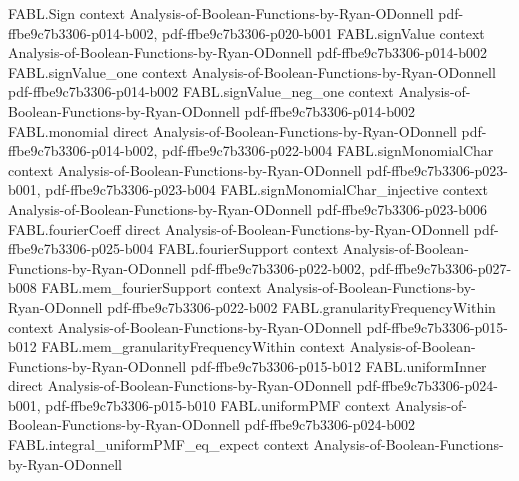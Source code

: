\begin{theorem}
\label{FABL.signValue_eq_biasMean_add_sigma_mul_biasedMonomial_singleton}
\leanok
{}
\proofstep
  {FABL.Sign}
  {context}
  {Analysis-of-Boolean-Functions-by-Ryan-ODonnell}
  {pdf-ffbe9c7b3306-p014-b002,
    pdf-ffbe9c7b3306-p020-b001}
\proofstep
  {FABL.signValue}
  {context}
  {Analysis-of-Boolean-Functions-by-Ryan-ODonnell}
  {pdf-ffbe9c7b3306-p014-b002}
\proofstep
  {FABL.signValue_one}
  {context}
  {Analysis-of-Boolean-Functions-by-Ryan-ODonnell}
  {pdf-ffbe9c7b3306-p014-b002}
\proofstep
  {FABL.signValue_neg_one}
  {context}
  {Analysis-of-Boolean-Functions-by-Ryan-ODonnell}
  {pdf-ffbe9c7b3306-p014-b002}
\proofstep
  {FABL.monomial}
  {direct}
  {Analysis-of-Boolean-Functions-by-Ryan-ODonnell}
  {pdf-ffbe9c7b3306-p014-b002,
    pdf-ffbe9c7b3306-p022-b004}
\proofstep
  {FABL.signMonomialChar}
  {context}
  {Analysis-of-Boolean-Functions-by-Ryan-ODonnell}
  {pdf-ffbe9c7b3306-p023-b001,
    pdf-ffbe9c7b3306-p023-b004}
\proofstep
  {FABL.signMonomialChar_injective}
  {context}
  {Analysis-of-Boolean-Functions-by-Ryan-ODonnell}
  {pdf-ffbe9c7b3306-p023-b006}
\proofstep
  {FABL.fourierCoeff}
  {direct}
  {Analysis-of-Boolean-Functions-by-Ryan-ODonnell}
  {pdf-ffbe9c7b3306-p025-b004}
\proofstep
  {FABL.fourierSupport}
  {context}
  {Analysis-of-Boolean-Functions-by-Ryan-ODonnell}
  {pdf-ffbe9c7b3306-p022-b002,
    pdf-ffbe9c7b3306-p027-b008}
\proofstep
  {FABL.mem_fourierSupport}
  {context}
  {Analysis-of-Boolean-Functions-by-Ryan-ODonnell}
  {pdf-ffbe9c7b3306-p022-b002}
\proofstep
  {FABL.granularityFrequencyWithin}
  {context}
  {Analysis-of-Boolean-Functions-by-Ryan-ODonnell}
  {pdf-ffbe9c7b3306-p015-b012}
\proofstep
  {FABL.mem_granularityFrequencyWithin}
  {context}
  {Analysis-of-Boolean-Functions-by-Ryan-ODonnell}
  {pdf-ffbe9c7b3306-p015-b012}
\proofstep
  {FABL.uniformInner}
  {direct}
  {Analysis-of-Boolean-Functions-by-Ryan-ODonnell}
  {pdf-ffbe9c7b3306-p024-b001,
    pdf-ffbe9c7b3306-p015-b010}
\proofstep
  {FABL.uniformPMF}
  {context}
  {Analysis-of-Boolean-Functions-by-Ryan-ODonnell}
  {pdf-ffbe9c7b3306-p024-b002}
\proofstep
  {FABL.integral_uniformPMF_eq_expect}
  {context}
  {Analysis-of-Boolean-Functions-by-Ryan-ODonnell}

\end{theorem}
